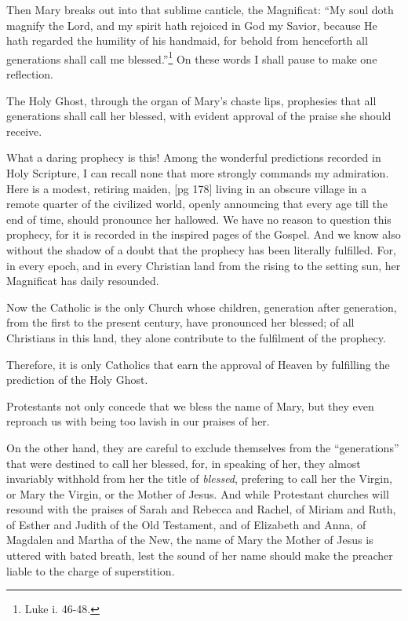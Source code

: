 Then Mary breaks out into that sublime canticle,
the Magnificat: “My soul doth magnify the
Lord, and my spirit hath rejoiced in God my
Savior, because He hath regarded the humility of
his handmaid, for behold from henceforth all generations
shall call me blessed.”\footnote{Luke i.
46-48.} On these words
I shall pause to make one reflection.

The Holy Ghost, through the organ of Mary's
chaste lips, prophesies that all generations shall
call her blessed, with evident approval of the
praise she should receive.

What a daring prophecy is this! Among the
wonderful predictions recorded in Holy Scripture,
I can recall none that more strongly commands my
admiration. Here is a modest, retiring maiden,
[pg 178]
living in an obscure village in a remote quarter of
the civilized world, openly announcing that every
age till the end of time, should pronounce her hallowed.
We have no reason to question this prophecy,
for it is recorded in the inspired pages of the
Gospel. And we know also without the shadow
of a doubt that the prophecy has been literally
fulfilled. For, in every epoch, and in every Christian
land from the rising to the setting sun, her
Magnificat has daily resounded.

Now the Catholic is the only Church whose children,
generation after generation, from the first to
the present century, have pronounced her blessed;
of all Christians in this land, they alone contribute
to the fulfilment of the prophecy.

Therefore, it is only Catholics that earn the approval
of Heaven by fulfilling the prediction of
the Holy Ghost.

Protestants not only concede that we bless the
name of Mary, but they even reproach us with being
too lavish in our praises of her.

On the other hand, they are careful to exclude
themselves from the “generations” that were destined
to call her blessed, for, in speaking of her,
they almost invariably withhold from her the title
of \emph{blessed}, prefering to call her the Virgin, or
Mary the Virgin, or the Mother of Jesus.
And while Protestant churches will resound with the
praises of Sarah and Rebecca and Rachel, of
Miriam and Ruth, of Esther and Judith of the Old
Testament, and of Elizabeth and Anna, of Magdalen
and Martha of the New, the name of Mary
the Mother of Jesus is uttered with bated breath,
lest the sound of her name should make the
preacher liable to the charge of superstition.

